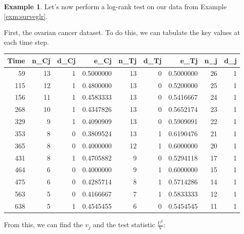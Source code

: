 \documentclass[
  openany]{book}
\newenvironment{Shaded}{\begin{snugshade}}{\end{snugshade}}
\newcommand{\CommentTok}[1]{\textcolor[rgb]{0.56,0.35,0.01}{\textit{#1}}}
\newcommand{\ControlFlowTok}[1]{\textcolor[rgb]{0.13,0.29,0.53}{\textbf{#1}}}
\newcommand{\DecValTok}[1]{\textcolor[rgb]{0.00,0.00,0.81}{#1}}
\newcommand{\FunctionTok}[1]{\textcolor[rgb]{0.13,0.29,0.53}{\textbf{#1}}}
\newcommand{\NormalTok}[1]{#1}
\newcommand{\OtherTok}[1]{\textcolor[rgb]{0.56,0.35,0.01}{#1}}
\newcommand{\SpecialCharTok}[1]{\textcolor[rgb]{0.81,0.36,0.00}{\textbf{#1}}}
\theoremstyle{definition}
\theoremstyle{definition}
\newtheorem{example}{Example}[chapter]
\theoremstyle{definition}
\theoremstyle{definition}
\theoremstyle{remark}
\begin{document}
\begin{example}
Let's now perform a log-rank test on our data from Example \ref{exm:surveglr}.

First, the ovarian cancer dataset. To do this, we can tabulate the key values at each time step.

\begin{tabular}{r|r|r|r|r|r|r|r|r}
\hline
Time & n\_Cj & d\_Cj & e\_Cj & n\_Tj & d\_Tj & e\_Tj & n\_j & d\_j\\
\hline
59 & 13 & 1 & 0.5000000 & 13 & 0 & 0.5000000 & 26 & 1\\
\hline
115 & 12 & 1 & 0.4800000 & 13 & 0 & 0.5200000 & 25 & 1\\
\hline
156 & 11 & 1 & 0.4583333 & 13 & 0 & 0.5416667 & 24 & 1\\
\hline
268 & 10 & 1 & 0.4347826 & 13 & 0 & 0.5652174 & 23 & 1\\
\hline
329 & 9 & 1 & 0.4090909 & 13 & 0 & 0.5909091 & 22 & 1\\
\hline
353 & 8 & 0 & 0.3809524 & 13 & 1 & 0.6190476 & 21 & 1\\
\hline
365 & 8 & 0 & 0.4000000 & 12 & 1 & 0.6000000 & 20 & 1\\
\hline
431 & 8 & 1 & 0.4705882 & 9 & 0 & 0.5294118 & 17 & 1\\
\hline
464 & 6 & 0 & 0.4000000 & 9 & 1 & 0.6000000 & 15 & 1\\
\hline
475 & 6 & 0 & 0.4285714 & 8 & 1 & 0.5714286 & 14 & 1\\
\hline
563 & 5 & 0 & 0.4166667 & 7 & 1 & 0.5833333 & 12 & 1\\
\hline
638 & 5 & 1 & 0.4545455 & 6 & 0 & 0.5454545 & 11 & 1\\
\hline
\end{tabular}

From this, we can find the \(v_{j}\) and the test statistic \(\frac{U^2}{V}\):

\begin{Shaded}
\end{Shaded}
\end{example}
\end{document}
